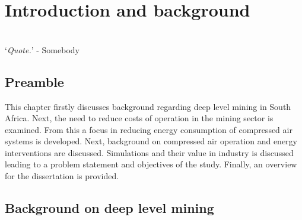 \chapter{Introduction and background}  %
\thispagestyle{empty}
\vspace{38em}
\hrulefill
\\
\enquote*{\textit{Quote.}} - Somebody\\
\newpage

\section{Preamble}
This chapter firstly discusses background regarding deep level mining in South Africa. Next, the need to reduce costs of operation in the mining sector is examined. From this a focus in reducing energy consumption of compressed air systems is developed. Next, background on compressed air operation and energy interventions are discussed. Simulations and their value in industry is discussed leading to a problem statement and objectives of the study. Finally, an overview for the dissertation is provided.
\section{Background on deep level mining}
